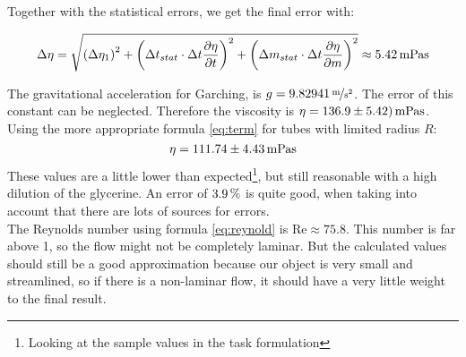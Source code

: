 Together with the statistical errors, we get the final error with:

\begin{equation}
\Delta \eta = \sqrt{\left(\Delta \eta_1\right)^2 + \left(
\Delta t_{stat} \cdot \Delta t\frac{\partial \eta}{\partial t}
\right)^2 +
\left(
\Delta m_{stat} \cdot \Delta t\frac{\partial \eta}{\partial m}
\right)^2}
\approx \unit[5.42]{mPa s}
\end{equation}

The gravitational acceleration for Garching, is $g = \unitfrac[9.82941]{m}{s^2}$. The error of this constant can be neglected. Therefore the viscosity is $\eta = \unit[136.9 \pm 5.42)]{mPa s} $.\\
Using the more appropriate formula \ref{eq:term} for tubes with limited radius $R$:
\begin{equation}
\eta = \unit[111.74 \pm 4.43]{mPa s}
\end{equation}
These values are a little lower than expected\footnote{Looking at the sample values in the task formulation}, but still reasonable with a high dilution of the glycerine. An error of $\unit[3.9]{\%}$ is quite good, when taking into account that there are lots of sources for errors.\\
The Reynolds number using formula \ref{eq:reynold} is $\text{Re} \approx 75.8$. This number is far above 1, so the flow might not be completely laminar. But the calculated values should still be a good approximation because our object is very small and streamlined, so if there is a non-laminar flow, it should have a very little weight to the final result.





